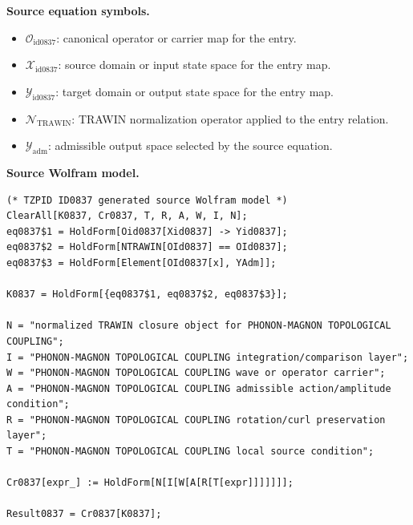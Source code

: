 \begin{minipage}[t]{0.49\linewidth}
\begingroup
\small
\raggedright
\textbf{Source equation symbols.}\par
\begin{itemize}[leftmargin=1.35em,itemsep=1pt,topsep=1pt,parsep=0pt]
    \item $\mathcal{O}_{\mathrm{id0837}}$: canonical operator or carrier map for the entry.
    \item $\mathcal{X}_{\mathrm{id0837}}$: source domain or input state space for the entry map.
    \item $\mathcal{Y}_{\mathrm{id0837}}$: target domain or output state space for the entry map.
    \item $\mathcal{N}_{\mathrm{TRAWIN}}$: TRAWIN normalization operator applied to the entry relation.
    \item $\mathcal{Y}_{\mathrm{adm}}$: admissible output space selected by the source equation.
\end{itemize}
\endgroup
\end{minipage}\hfill
\begin{minipage}[t]{0.47\linewidth}
\begingroup
\scriptsize
\raggedright
\textbf{Source Wolfram model.}\par
\begin{Verbatim}[fontsize=\tiny,breaklines=true,breakanywhere=true]
(* TZPID ID0837 generated source Wolfram model *)
ClearAll[K0837, Cr0837, T, R, A, W, I, N];
eq0837$1 = HoldForm[Oid0837[Xid0837] -> Yid0837];
eq0837$2 = HoldForm[NTRAWIN[OId0837] == OId0837];
eq0837$3 = HoldForm[Element[OId0837[x], YAdm]];

K0837 = HoldForm[{eq0837$1, eq0837$2, eq0837$3}];

N = "normalized TRAWIN closure object for PHONON-MAGNON TOPOLOGICAL COUPLING";
I = "PHONON-MAGNON TOPOLOGICAL COUPLING integration/comparison layer";
W = "PHONON-MAGNON TOPOLOGICAL COUPLING wave or operator carrier";
A = "PHONON-MAGNON TOPOLOGICAL COUPLING admissible action/amplitude condition";
R = "PHONON-MAGNON TOPOLOGICAL COUPLING rotation/curl preservation layer";
T = "PHONON-MAGNON TOPOLOGICAL COUPLING local source condition";

Cr0837[expr_] := HoldForm[N[I[W[A[R[T[expr]]]]]]];

Result0837 = Cr0837[K0837];
\end{Verbatim}
\endgroup
\end{minipage}

